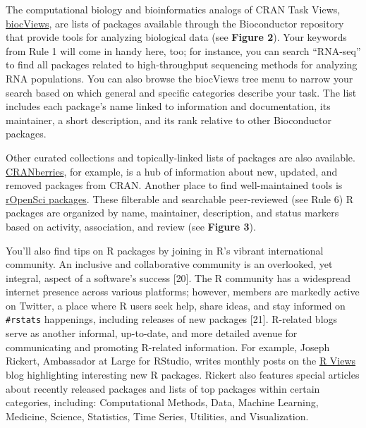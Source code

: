 \documentclass[10pt,letterpaper]{article}
\begin{document}
The computational biology and bioinformatics analogs of CRAN Task Views,
\href{https://www.bioconductor.org/packages/release/BiocViews.html\#___Software}{biocViews},
are lists of packages available through the Bioconductor repository that
provide tools for analyzing biological data (see \textbf{Figure 2}).
Your keywords from Rule 1 will come in handy here, too; for instance,
you can search ``RNA-seq'' to find all packages related to
high-throughput sequencing methods for analyzing RNA populations. You
can also browse the biocViews tree menu to narrow your search based on
which general and specific categories describe your task. The list
includes each package's name linked to information and documentation,
its maintainer, a short description, and its rank relative to other
Bioconductor packages.

Other curated collections and topically-linked lists of packages are
also available.
\href{http://dirk.eddelbuettel.com/cranberries/index.html}{CRANberries},
for example, is a hub of information about new, updated, and removed
packages from CRAN. Another place to find well-maintained tools is
\href{https://ropensci.org/packages/}{rOpenSci packages}. These
filterable and searchable peer-reviewed (see Rule 6) R packages are
organized by name, maintainer, description, and status markers based on
activity, association, and review (see \textbf{Figure 3}).

You'll also find tips on R packages by joining in R's vibrant
international community. An inclusive and collaborative community is an
overlooked, yet integral, aspect of a software's success {[}20{]}. The R
community has a widespread internet presence across various platforms;
however, members are markedly active on Twitter, a place where R users
seek help, share ideas, and stay informed on \texttt{\#rstats}
happenings, including releases of new packages {[}21{]}. R-related blogs
serve as another informal, up-to-date, and more detailed avenue for
communicating and promoting R-related information. For example, Joseph
Rickert, Ambassador at Large for RStudio, writes monthly posts on the
\href{https://rviews.rstudio.com/}{R Views} blog highlighting
interesting new R packages. Rickert also features special articles about
recently released packages and lists of top packages within certain
categories, including: Computational Methods, Data, Machine Learning,
Medicine, Science, Statistics, Time Series, Utilities, and
Visualization.
\end{document}
